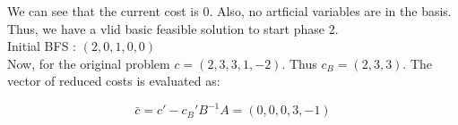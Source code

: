 We can see that the current cost is 0. Also, no artficial variables are in the basis. Thus, we have a vlid basic feasible solution to start phase 2. \\

Initial BFS : $(2,0,1,0,0)$ \\

Now, for the original problem $c = (2,3,3,1,-2)$. Thus $c_B = (2,3,3)$. The vector of reduced costs is evaluated as:

\[ \bar{c} = c' - c_B'B^{-1}A = (0,0,0,3,-1)\]

